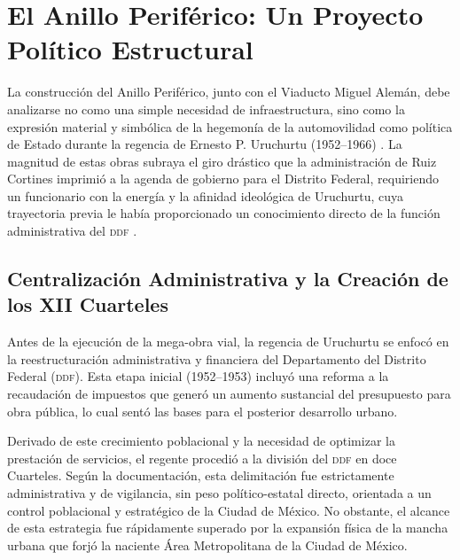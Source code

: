 \section{El Anillo Periférico: Un Proyecto Político Estructural}
\label{sec:anillo-periferico}

La construcción del Anillo Periférico, junto con el Viaducto Miguel Alemán, debe
analizarse no como una simple necesidad de infraestructura, sino como la expresión
material y simbólica de la hegemonía de la automovilidad como política de Estado
durante la regencia de Ernesto P. Uruchurtu (1952--1966) \parencite{franco2022}.
La magnitud de estas obras subraya el giro drástico que la administración de Ruiz
Cortines imprimió a la agenda de gobierno para el Distrito Federal, requiriendo un
funcionario con la energía y la afinidad ideológica de Uruchurtu, cuya trayectoria
previa le había proporcionado un conocimiento directo de la función administrativa
del \textsc{ddf} \parencite[Tomo~1, p.~173]{perlo2023}.

\subsection{Centralización Administrativa y la Creación de los XII Cuarteles}
\label{subsec:xii-cuarteles}

Antes de la ejecución de la mega-obra vial, la regencia de Uruchurtu se enfocó en
la reestructuración administrativa y financiera del Departamento del Distrito Federal
(\textsc{ddf}). Esta etapa inicial (1952--1953) incluyó una reforma a la recaudación
de impuestos que generó un aumento sustancial del presupuesto para obra pública,
lo cual sentó las bases para el posterior desarrollo urbano.

Derivado de este crecimiento poblacional y la necesidad de optimizar la prestación
de servicios, el regente procedió a la división del \textsc{ddf} en doce Cuarteles.
Según la documentación, esta delimitación fue estrictamente administrativa y de
vigilancia, sin peso político-estatal directo, orientada a un control poblacional y
estratégico de la Ciudad de México. No obstante, el alcance de esta estrategia fue
rápidamente superado por la expansión física de la mancha urbana que forjó la
naciente Área Metropolitana de la Ciudad de México.

